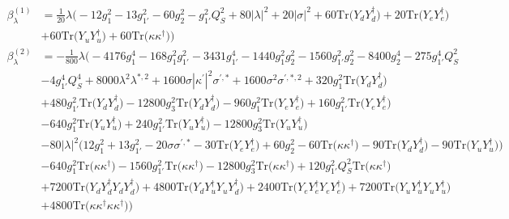 {\begin{align}
\beta_{\lambda}^{(1)} & =  
\frac{1}{20} \lambda \Big(-12 g_{1}^{2} -13 g_{1'}^{2} -60 g_{2}^{2} - g_{1'}^{2} Q_{S}^{2} +80 |\lambda|^2 +20 |\sigma|^2 +60 \mbox{Tr}\Big({Y_d  Y_{d}^{\dagger}}\Big) +20 \mbox{Tr}\Big({Y_e  Y_{e}^{\dagger}}\Big) \nonumber \\ 
 &+60 \mbox{Tr}\Big({Y_u  Y_{u}^{\dagger}}\Big) +60 \mbox{Tr}\Big({\kappa  \kappa^{\dagger}}\Big) \Big)\\ 
\beta_{\lambda}^{(2)} & =  
-\frac{1}{800} \lambda \Big(-4176 g_{1}^{4} -168 g_{1}^{2} g_{1'}^{2} -3431 g_{1'}^{4} -1440 g_{1}^{2} g_{2}^{2} -1560 g_{1'}^{2} g_{2}^{2} -8400 g_{2}^{4} -275 g_{1'}^{4} Q_{S}^{2} \nonumber \\ 
 &-4 g_{1'}^{4} Q_{S}^{4} +8000 \lambda^{2} \lambda^{*,2} +1600 \sigma |\kappa^\prime|^2 \sigma^{\prime,*} +1600 \sigma^{2} \sigma^{\prime,*,2} +320 g_{1}^{2} \mbox{Tr}\Big({Y_d  Y_{d}^{\dagger}}\Big) \nonumber \\ 
 &+480 g_{1'}^{2} \mbox{Tr}\Big({Y_d  Y_{d}^{\dagger}}\Big) -12800 g_{3}^{2} \mbox{Tr}\Big({Y_d  Y_{d}^{\dagger}}\Big) -960 g_{1}^{2} \mbox{Tr}\Big({Y_e  Y_{e}^{\dagger}}\Big) +160 g_{1'}^{2} \mbox{Tr}\Big({Y_e  Y_{e}^{\dagger}}\Big) \nonumber \\ 
 &-640 g_{1}^{2} \mbox{Tr}\Big({Y_u  Y_{u}^{\dagger}}\Big) +240 g_{1'}^{2} \mbox{Tr}\Big({Y_u  Y_{u}^{\dagger}}\Big) -12800 g_{3}^{2} \mbox{Tr}\Big({Y_u  Y_{u}^{\dagger}}\Big) \nonumber \\ 
 &-80 |\lambda|^2 \Big(12 g_{1}^{2}  + 13 g_{1'}^{2}  -20 \sigma \sigma^{\prime,*}  -30 \mbox{Tr}\Big({Y_e  Y_{e}^{\dagger}}\Big)  + 60 g_{2}^{2}  -60 \mbox{Tr}\Big({\kappa  \kappa^{\dagger}}\Big)  -90 \mbox{Tr}\Big({Y_d  Y_{d}^{\dagger}}\Big)  -90 \mbox{Tr}\Big({Y_u  Y_{u}^{\dagger}}\Big) \Big)\nonumber \\ 
 &-640 g_{1}^{2} \mbox{Tr}\Big({\kappa  \kappa^{\dagger}}\Big) -1560 g_{1'}^{2} \mbox{Tr}\Big({\kappa  \kappa^{\dagger}}\Big) -12800 g_{3}^{2} \mbox{Tr}\Big({\kappa  \kappa^{\dagger}}\Big) +120 g_{1'}^{2} Q_{S}^{2} \mbox{Tr}\Big({\kappa  \kappa^{\dagger}}\Big) \nonumber \\ 
 &+7200 \mbox{Tr}\Big({Y_d  Y_{d}^{\dagger}  Y_d  Y_{d}^{\dagger}}\Big) +4800 \mbox{Tr}\Big({Y_d  Y_{u}^{\dagger}  Y_u  Y_{d}^{\dagger}}\Big) +2400 \mbox{Tr}\Big({Y_e  Y_{e}^{\dagger}  Y_e  Y_{e}^{\dagger}}\Big) +7200 \mbox{Tr}\Big({Y_u  Y_{u}^{\dagger}  Y_u  Y_{u}^{\dagger}}\Big) \nonumber \\ 
 &+4800 \mbox{Tr}\Big({\kappa  \kappa^{\dagger}  \kappa  \kappa^{\dagger}}\Big) \Big)\\ 

\end{align}}
